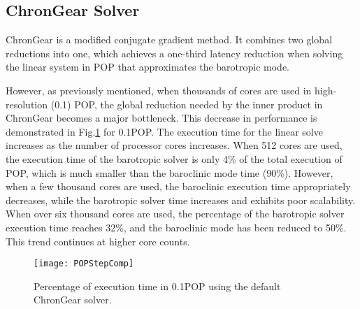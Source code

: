 \subsection{ChronGear Solver }
ChronGear \cite{dAzevedo1999lapack} is a modified conjugate gradient method.
It combines two global reductions into one, which achieves a one-third
latency reduction when solving the linear system in POP that
approximates the barotropic mode.

However, as previously mentioned, when thousands of cores are used in high-resolution (0.1\degree) POP,
the global reduction needed by the inner product in ChronGear becomes a major bottleneck.
This decrease in performance is demonstrated in
Fig.\ref{fig:StepComp} for  0.1\degree POP.  The execution time for the linear solve increases as the number of processor cores increases. 
When 512 cores are used, the execution time of the barotropic solver is only 4\% of the total execution of POP, which is much smaller than the baroclinic mode time (90\%). 
However, when a few thousand cores are used, the baroclinic execution
time appropriately decreases, while the barotropic solver time
increases and exhibits poor scalability. 
When over six thousand cores are used, the percentage of the
barotropic solver execution time reaches 32\%, and the baroclinic mode
has been reduced to 50\%.   This trend continues at higher core counts.

\begin {figure}[!t]
\vspace{-5pt}
\centering
\texttt{[image: POPStepComp]}
\caption[] {Percentage of execution time in 0.1\degree POP using the default ChronGear solver.\label{fig:StepComp}}
\end{figure}



